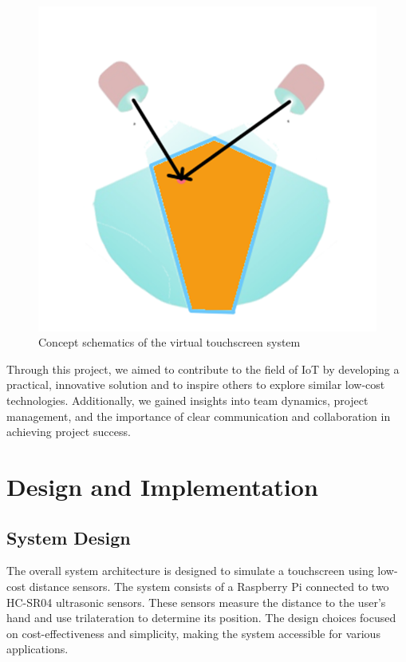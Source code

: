 \documentclass[12pt,a4paper]{article}
\begin{document}
\begin{figure}[!htp]
    \centering
    \includegraphics[scale=0.3]{../IoT Materials/article images/3-Concept-schematics.png}
    \caption{Concept schematics of the virtual touchscreen system}
\end{figure}

Through this project, we aimed to contribute to the field of IoT by developing a practical, innovative solution and to inspire others to explore similar low-cost technologies. Additionally, we gained insights into team dynamics, project management, and the importance of clear communication and collaboration in achieving project success.

\section{Design and Implementation}

\subsection{System Design}
The overall system architecture is designed to simulate a touchscreen using low-cost distance sensors. The system consists of a Raspberry Pi connected to two HC-SR04 ultrasonic sensors. These sensors measure the distance to the user's hand and use trilateration to determine its position. The design choices focused on cost-effectiveness and simplicity, making the system accessible for various applications.
\end{document}

